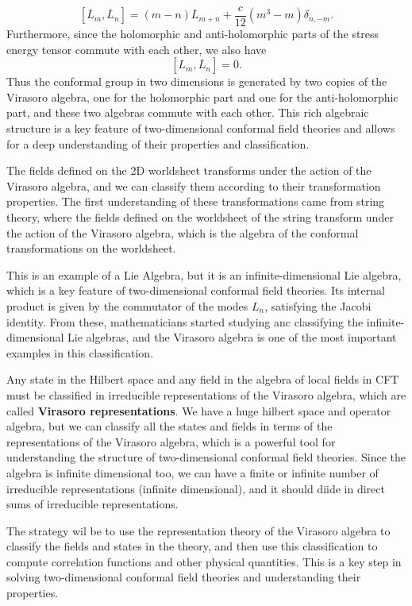 \[
    [\overline{L}_m, \overline{L}_n] = (m-n) \overline{L}_{m+n} + \frac{c}{12} (m^3 - m) \delta_{n, -m}.
\]
Furthermore, since the holomorphic and anti-holomorphic parts of the stress energy tensor commute with each other, we also have
\[
    [L_m, \overline{L}_n] = 0.
\]
Thus the conformal group in two dimensions is generated by two copies of the Virasoro algebra, one for the holomorphic part and one for the anti-holomorphic part, and these two algebras commute with each other. This rich algebraic structure is a key feature of two-dimensional conformal field theories and allows for a deep understanding of their properties and classification.

The fields defined on the 2D worldsheet transforms under the action of the Virasoro algebra, and we can classify them according to their transformation properties. The first understanding of these transformations came from string theory, where the fields defined on the worldsheet of the string transform under the action of the Virasoro algebra, which is the algebra of the conformal transformations on the worldsheet.

This is an example of a Lie Algebra, but it is an infinite-dimensional Lie algebra, which is a key feature of two-dimensional conformal field theories. Its internal product is given by the commutator of the modes \(L_n\), satisfying the Jacobi identity. From these, mathematicians started studying anc classifying the infinite-dimensional Lie algebras, and the Virasoro algebra is one of the most important examples in this classification.

Any state in the Hilbert space and any field in the algebra of local fields in CFT must be classified in irreducible representations of the Virasoro algebra, which are called \textbf{Virasoro representations}. We have a huge hilbert space and operator algebra, but we can classify all the states and fields in terms of the representations of the Virasoro algebra, which is a powerful tool for understanding the structure of two-dimensional conformal field theories. Since the algebra is infinite dimensional too, we can have a finite or infinite number of irreducible representations (infinite dimensional), and it should diide in direct sums of irreducible representations.

The strategy wil be to use the representation theory of the Virasoro algebra to classify the fields and states in the theory, and then use this classification to compute correlation functions and other physical quantities. This is a key step in solving two-dimensional conformal field theories and understanding their properties.

